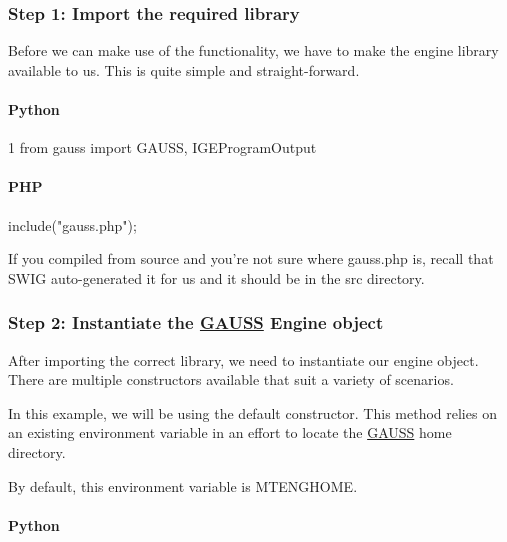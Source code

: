 \subsubsection*{Step 1\-: Import the required library}

Before we can make use of the functionality, we have to make the engine library available to us. This is quite simple and straight-\/forward.

\paragraph*{Python}


\begin{DoxyCode}
1 \textcolor{keyword}{from} gauss \textcolor{keyword}{import} GAUSS, IGEProgramOutput
\end{DoxyCode}


\paragraph*{P\-H\-P}


\begin{DoxyCode}
include(\textcolor{stringliteral}{"gauss.php"});
\end{DoxyCode}


If you compiled from source and you're not sure where {\ttfamily gauss.\-php} is, recall that S\-W\-I\-G auto-\/generated it for us and it should be in the {\ttfamily src} directory.

\subsubsection*{Step 2\-: Instantiate the \hyperlink{class_g_a_u_s_s}{G\-A\-U\-S\-S} Engine object}

After importing the correct library, we need to instantiate our engine object. There are multiple constructors available that suit a variety of scenarios.

In this example, we will be using the default constructor. This method relies on an existing environment variable in an effort to locate the \hyperlink{class_g_a_u_s_s}{G\-A\-U\-S\-S} home directory.

By default, this environment variable is {\ttfamily M\-T\-E\-N\-G\-H\-O\-M\-E}.

\paragraph*{Python}


